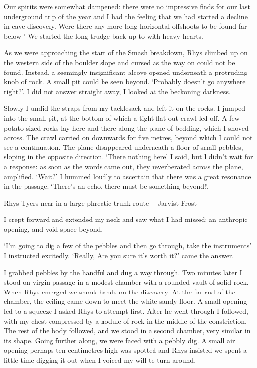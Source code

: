 Our spirits were somewhat dampened: there were no impressive finds for our last underground trip of the year and I had the feeling that we had started a decline in cave discovery. Were there any more long horizontal offshoots to be found far below ' We started the long trudge back up to  with heavy hearts.

As we were approaching the start of the Smash breakdown, Rhys climbed up on the western side of the boulder slope and cursed as the way on could not be found. Instead, a seemingly insignificant alcove opened underneath a protruding knob of rock. A small pit could be seen beyond. `Probably doesn't go anywhere right?'. I did not answer straight away, I looked at the beckoning darkness.

Slowly I undid the straps from my tacklesack and left it on the rocks. I jumped into the small  pit, at the bottom of which a tight flat out crawl led off. A few potato sized rocks lay here and there along the plane of bedding, which I shoved across. The crawl carried on downwards for five metres, beyond which I could not see a continuation. The plane disappeared underneath a floor of small pebbles, sloping in the opposite direction. `There nothing here' I said, but I didn't wait for a response: as soon as the words came out, they reverberated across the plane, amplified. `Wait?' I hummed loudly to ascertain that there was a great resonance in the passage. `There's an echo, there must be something beyond!'.
\begin{marginfigure}
	\checkoddpage \ifoddpage \forcerectofloat \else \forceversofloat \fi
	\centering
	\caption{Rhys Tyers near  in a large phreatic trunk route ---Jarvist Frost}
	\label{near duck}
\end{marginfigure}


I crept forward and extended my neck and saw what I had missed: an anthropic opening, and void space beyond. 

`I'm going to dig a few of the pebbles and then go through, take the instruments' I instructed excitedly. `Really, Are you sure it's worth it?' came the answer. 

I grabbed pebbles by the handful and dug a way through. Two minutes later I stood on virgin passage in a modest chamber with a rounded vault of solid rock. When Rhys emerged we shook hands on the discovery. At the far end of the chamber, the ceiling came down to meet the white sandy floor. A small opening led to a squeeze I asked Rhys to attempt first. After he went through I followed, with my chest compressed by a nodule of rock in the middle of the constriction. The rest of the body followed, and we stood in a second chamber, very similar in its shape. Going further along, we were faced with a pebbly dig. A small air opening perhaps ten centimetres high was spotted and Rhys insisted we spent a little time digging it out when I voiced my will to turn around. 

